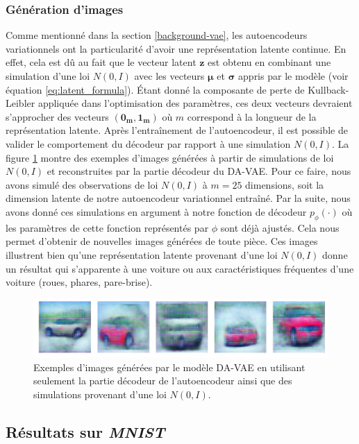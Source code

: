 \subsubsection{Génération d'images}

Comme mentionné dans la section \ref{background-vae}, les autoencodeurs variationnels ont la particularité d'avoir une représentation latente continue. En effet, cela est dû au fait que le vecteur latent $\boldsymbol{z}$ est obtenu en combinant une simulation d'une loi $N(0,I)$ avec les vecteurs $\boldsymbol{\mu}$ et $\boldsymbol{\sigma}$ appris par le modèle (voir équation \ref{eq:latent_formula}). Étant donné la composante de perte de Kullback-Leibler appliquée dans l'optimisation des paramètres, ces deux vecteurs devraient s'approcher des vecteurs $(\boldsymbol{0_{m}}, \boldsymbol{1_{m}})$ où $m$ correspond à la longueur de la représentation latente. Après l'entraînement de l'autoencodeur, il est possible de valider le comportement du décodeur par rapport à une simulation $N(0,I)$. La figure \ref{fig:generated_cars} montre des exemples d'images générées à partir de simulations de loi $N(0,I)$ et reconstruites par la partie décodeur du DA-VAE. Pour ce faire, nous avons simulé des observations de loi $N(0,I)$ à $m=25$ dimensions, soit la dimension latente de notre autoencodeur variationnel entraîné. Par la suite, nous avons donné ces simulations en argument à notre fonction de décodeur $p_{\phi}(\cdot)$ où les paramètres de cette fonction représentés par $\phi$ sont déjà ajustés. Cela nous permet d'obtenir de nouvelles images générées de toute pièce. Ces images illustrent bien qu'une représentation latente provenant d'une loi $N(0,I)$ donne un résultat qui s'apparente à une voiture ou aux caractéristiques fréquentes d'une voiture (roues, phares, pare-brise).

\begin{figure}[htb]
	\centering
	\includegraphics[width=\textwidth]{images/generated_cars}
	\caption{Exemples d'images générées par le modèle DA-VAE en utilisant seulement la partie décodeur de l'autoencodeur ainsi que des simulations provenant d'une loi $N(0,I)$.}
	\label{fig:generated_cars}
\end{figure}

\subsection{Résultats sur \textit{MNIST}}

